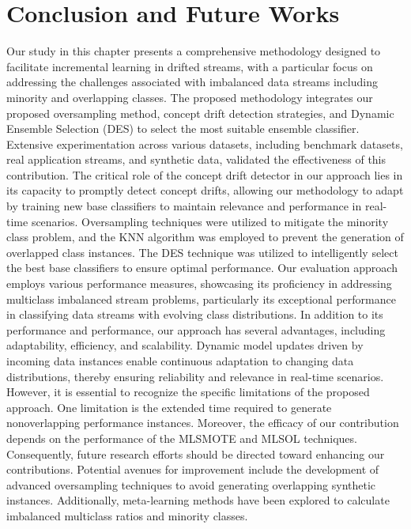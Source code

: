 %
%


\section{Conclusion and Future Works}
\label{sec:4_8_Conclusions}

Our study in this chapter presents a comprehensive methodology designed to facilitate incremental learning in drifted streams, with a particular focus on addressing the challenges associated with imbalanced data streams including minority and overlapping classes. The proposed methodology integrates our proposed oversampling method, concept drift detection strategies, and Dynamic Ensemble Selection (DES) to select the most suitable ensemble classifier. Extensive experimentation across various datasets, including benchmark datasets, real application streams, and synthetic data, validated the effectiveness of this contribution. The critical role of the concept drift detector in our approach lies in its capacity to promptly detect concept drifts, allowing our methodology to adapt by training new base classifiers to maintain relevance and performance in real-time scenarios. Oversampling techniques were utilized to mitigate the minority class problem, and the KNN algorithm was employed to prevent the generation of overlapped class instances. The DES technique was utilized to intelligently select the best base classifiers to ensure optimal performance. Our evaluation approach employs various performance measures, showcasing its proficiency in addressing multiclass imbalanced stream problems, particularly its exceptional performance in classifying data streams with evolving class distributions. In addition to its performance and performance, our approach has several advantages, including adaptability, efficiency, and scalability. Dynamic model updates driven by incoming data instances enable continuous adaptation to changing data distributions, thereby ensuring reliability and relevance in real-time scenarios. However, it is essential to recognize the specific limitations of the proposed approach. One limitation is the extended time required to generate nonoverlapping performance instances. Moreover, the efficacy of our contribution depends on the performance of the MLSMOTE and MLSOL techniques. Consequently, future research efforts should be directed toward enhancing our contributions. Potential avenues for improvement include the development of advanced oversampling techniques to avoid generating overlapping synthetic instances. Additionally, meta-learning methods have been explored to calculate imbalanced multiclass ratios and minority classes.